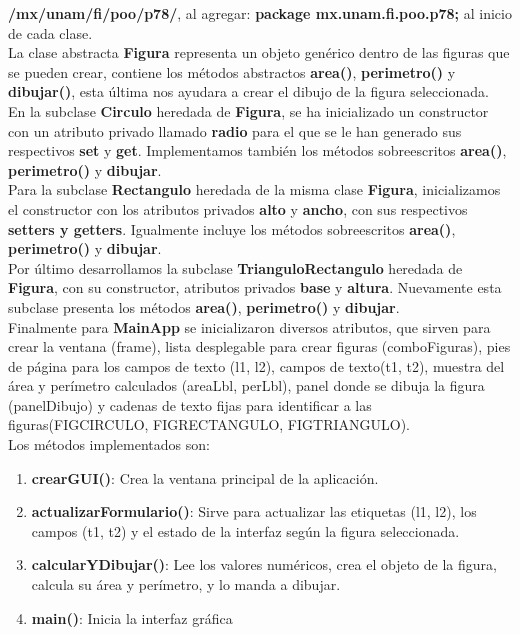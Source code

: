 \documentclass[letterpaper,12pt]{article}
\begin{document}
\textbf{/mx/unam/fi/poo/p78/}, al agregar: \textbf{package mx.unam.fi.poo.p78;} al inicio de cada clase.\\

La clase abstracta \textbf{Figura} representa un objeto genérico dentro de las figuras que se pueden crear, contiene los métodos abstractos \textbf{area()}, \textbf{perimetro()} y \textbf{dibujar()}, esta última nos ayudara a crear el dibujo de la figura seleccionada.\\

En la subclase \textbf{Circulo} heredada de \textbf{Figura}, se ha inicializado un constructor con un atributo privado llamado \textbf{radio} para el que se le han generado sus respectivos \textbf{set} y \textbf{get}. Implementamos también los métodos sobreescritos \textbf{area()}, \textbf{perimetro()} y \textbf{dibujar}.\\

Para la subclase \textbf{Rectangulo} heredada de la misma clase \textbf{Figura}, inicializamos el constructor con los atributos privados \textbf{alto} y \textbf{ancho}, con sus respectivos \textbf{setters y getters}. Igualmente incluye los métodos sobreescritos \textbf{area()}, \textbf{perimetro()} y \textbf{dibujar}.\\

Por último desarrollamos la subclase \textbf{TrianguloRectangulo} heredada de \textbf{Figura}, con su constructor, atributos privados \textbf{base} y \textbf{altura}. Nuevamente esta subclase presenta los métodos \textbf{area()}, \textbf{perimetro()} y \textbf{dibujar}.\\

 Finalmente para \textbf{MainApp} se inicializaron diversos atributos, que sirven para crear la ventana (frame), lista desplegable para crear figuras (comboFiguras), pies de página para los campos de texto (l1, l2), campos de texto(t1, t2), muestra del área y perímetro calculados (areaLbl, perLbl), panel donde se dibuja la figura (panelDibujo) y cadenas de texto fijas para identificar a las figuras(FIGCIRCULO, FIGRECTANGULO, FIGTRIANGULO).\\
 Los métodos implementados son: 
 \begin{enumerate}
     \item \textbf{crearGUI()}: Crea la ventana principal de la aplicación.
     \item \textbf{actualizarFormulario()}: Sirve para actualizar las etiquetas (l1, l2), los campos (t1, t2) y el estado de la interfaz según la figura seleccionada. 
     \item \textbf{calcularYDibujar()}: Lee los valores numéricos, crea el objeto de la figura, calcula su área y perímetro, y lo manda a dibujar.
     \item \textbf{main()}: Inicia la interfaz gráfica
 \end{enumerate}
 
\end{document}
